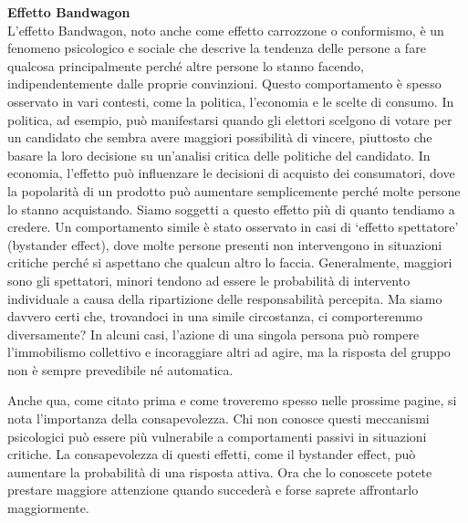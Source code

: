 \documentclass[12pt]{book} %
\begin{document}
\noindent \textbf{\large Effetto Bandwagon} \\
L'effetto Bandwagon, noto anche come effetto carrozzone o conformismo, è un fenomeno psicologico e
sociale che descrive la tendenza delle persone a fare qualcosa principalmente perché altre persone lo stanno facendo,
indipendentemente dalle proprie convinzioni. Questo comportamento è spesso osservato in vari contesti, come la
politica, l'economia e le scelte di consumo. In politica, ad esempio, può manifestarsi quando gli
elettori scelgono di votare per un candidato che sembra avere maggiori possibilità di vincere, piuttosto che basare la
loro decisione su un'analisi critica delle politiche del candidato. In economia,
l'effetto può influenzare le decisioni di acquisto dei consumatori, dove la popolarità di un
prodotto può aumentare semplicemente perché molte persone lo stanno acquistando. Siamo soggetti a questo effetto più di quanto tendiamo a credere. Un comportamento simile è stato osservato in casi di ‘effetto spettatore’ (bystander effect), dove molte persone presenti non intervengono in situazioni critiche perché si aspettano che qualcun altro lo faccia. Generalmente, maggiori sono gli spettatori, minori tendono ad essere le probabilità di intervento individuale a causa della ripartizione delle responsabilità percepita. Ma siamo davvero certi che, trovandoci in una simile circostanza, ci comporteremmo diversamente? In alcuni casi, l’azione di una singola persona può rompere l’immobilismo collettivo e incoraggiare altri ad agire, ma la risposta del gruppo non è sempre prevedibile né automatica.

Anche qua, come citato prima e come troveremo spesso nelle prossime pagine, si nota l'importanza
della consapevolezza. Chi non conosce questi meccanismi psicologici può essere più vulnerabile a comportamenti passivi in situazioni critiche. La consapevolezza di questi effetti, come il bystander effect, può aumentare la probabilità di una risposta attiva. Ora che lo
conoscete potete prestare maggiore attenzione quando succederà e forse saprete affrontarlo maggiormente. 
\end{document}
